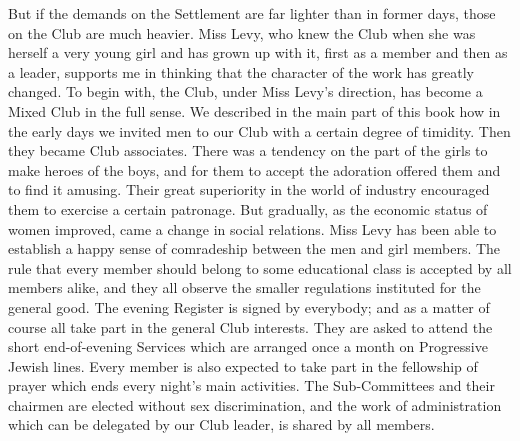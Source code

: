 But if the demands on the Settlement are far lighter
than in former days, those on the Club are much
heavier. Miss Levy, who knew the Club when she was
herself a very young girl and has grown up with it, first
as a member and then as a leader, supports me in
thinking that the character of the work has greatly
changed. To begin with, the Club, under Miss Levy’s
direction, has become a Mixed Club in the full sense.
We described in the main part of this book how in the
early days we invited men to our Club with a certain
degree of timidity. Then they became Club associates.
There was a tendency on the part of the girls to make
heroes of the boys, and for them to accept the adoration
offered them and to find it amusing.
Their great superiority in the world of industry
encouraged them to exercise a certain patronage. But
gradually, as the economic status of women improved,
came a change in social relations. Miss Levy has been
able to establish a happy sense of comradeship between
the men and girl members. The rule that every member
should belong to some educational class is accepted by
all members alike, and they all observe the smaller
regulations instituted for the general good. The evening
Register is signed by everybody; and as a matter of
course all take part in the general Club interests. They
are asked to attend the short end-of-evening Services
which are arranged once a month on Progressive
Jewish lines. Every member is also expected to take part
in the fellowship of prayer which ends every night’s
main activities. The Sub-Committees and their chairmen
are elected without sex discrimination, and the
work of administration which can be delegated by our
Club leader, is shared by all members.

